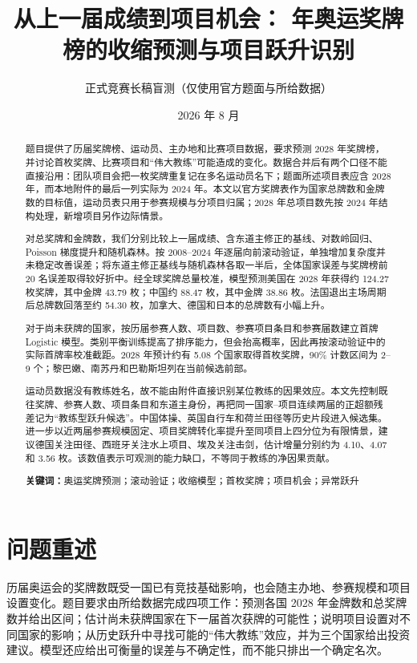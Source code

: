 \documentclass[UTF8,11pt,a4paper]{ctexart}
\title{从上一届成绩到项目机会：\newline 2028 年奥运奖牌榜的收缩预测与项目跃升识别}
\author{正式竞赛长稿盲测（仅使用官方题面与所给数据）}
\date{2026 年 8 月}
\newcommand{\keywords}[1]{\par\noindent\textbf{关键词：}#1}
\begin{document}
\maketitle

\begin{abstract}
题目提供了历届奖牌榜、运动员、主办地和比赛项目数据，要求预测 2028 年奖牌榜，并讨论首枚奖牌、比赛项目和“伟大教练”可能造成的变化。数据合并后有两个口径不能直接沿用：团队项目会把一枚奖牌重复记在多名运动员名下；题面所述项目表应含 2028 年，而本地附件的最后一列实际为 2024 年。本文以官方奖牌表作为国家总牌数和金牌数的目标值，运动员表只用于参赛规模与分项目归属；2028 年总项目数先按 2024 年结构处理，新增项目另作边际情景。

对总奖牌和金牌数，我们分别比较上一届成绩、含东道主修正的基线、对数岭回归、Poisson 梯度提升和随机森林。按 2008--2024 年逐届向前滚动验证，单独增加复杂度并未稳定改善误差；将东道主修正基线与随机森林各取一半后，全体国家误差与奖牌榜前 20 名误差取得较好折中。经全球奖牌总量校准，模型预测美国在 2028 年获得约 124.27 枚奖牌，其中金牌 43.79 枚；中国约 88.47 枚，其中金牌 38.86 枚。法国退出主场周期后总牌数回落至约 54.30 枚，加拿大、德国和日本的总牌数有小幅上升。

对于尚未获牌的国家，按历届参赛人数、项目数、参赛项目条目和参赛届数建立首牌 Logistic 模型。类别平衡训练提高了排序能力，但会抬高概率，因此再按滚动验证中的实际首牌率校准截距。2028 年预计约有 5.08 个国家取得首枚奖牌，90\% 计数区间为 2--9 个；黎巴嫩、南苏丹和巴勒斯坦列在当前候选前部。

运动员数据没有教练姓名，故不能由附件直接识别某位教练的因果效应。本文先控制既往奖牌、参赛人数、项目条目和东道主身份，再把同一国家--项目连续两届的正超额残差记为“教练型跃升候选”。中国体操、英国自行车和荷兰田径等历史片段进入候选集。进一步以近两届参赛规模固定、项目奖牌转化率提升至同项目上四分位为有限情景，建议德国关注田径、西班牙关注水上项目、埃及关注击剑，估计增量分别约为 4.10、4.07 和 3.56 枚。该数值表示可观测的能力缺口，不等同于教练的净因果贡献。

\keywords{奥运奖牌预测；滚动验证；收缩模型；首枚奖牌；项目机会；异常跃升}
\end{abstract}

\label{mcm-body-start}
\section{问题重述}

历届奥运会的奖牌数既受一国已有竞技基础影响，也会随主办地、参赛规模和项目设置变化。题目要求由所给数据完成四项工作：预测各国 2028 年金牌数和总奖牌数并给出区间；估计尚未获牌国家在下一届首次获牌的可能性；说明项目设置对不同国家的影响；从历史跃升中寻找可能的“伟大教练”效应，并为三个国家给出投资建议。模型还应给出可衡量的误差与不确定性，而不能只排出一个确定名次。
\end{document}
